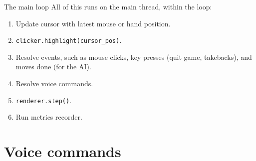 \documentclass[english]{beamer}
\begin{document}
\begin{frame}{The main loop}
    All of this runs on the main thread, within the loop:

    \begin{enumerate}
        \item Update cursor with latest mouse or hand position.
        \item \texttt{clicker.highlight(cursor\_pos)}.
        \item Resolve events, such as mouse clicks, key presses (quit game, takebacks), and moves done (for the AI).
        \item Resolve voice commands.
        \item \texttt{renderer.step()}.
        \item Run metrics recorder.
    \end{enumerate}
\end{frame}


\section{Voice commands}
\end{document}

